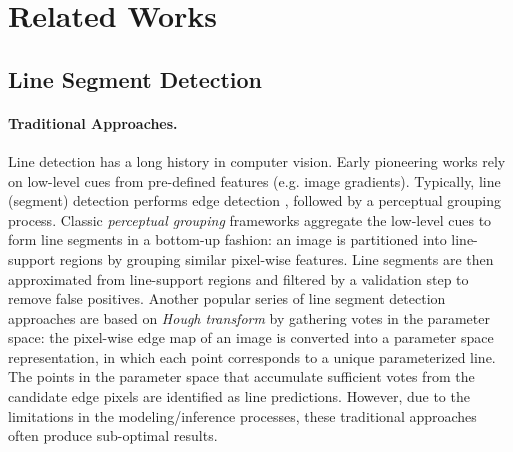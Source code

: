 \documentclass[final]{cvpr}
\begin{document}
\section{Related Works}

\subsection{Line Segment Detection}
\vspace{-2mm}
\paragraph{Traditional Approaches.} Line detection has a long history in computer vision. Early pioneering works rely on low-level cues from pre-defined features (e.g. image gradients). 
Typically, line (segment) detection performs edge detection \cite{canny1986computational,martin2004learning,dollar2006supervised,dollar2013structured,xie2015holistically}, followed by a perceptual grouping \cite{guil1995fast,smith1997susan,elder2002ecological} process.
Classic \textit{perceptual grouping} frameworks \cite{BurnsHR86,boldt1989token,nieto2011line,lu2015cannylines,VonGioi2010} aggregate the low-level cues to form line segments in a bottom-up fashion: an image is partitioned into line-support regions by grouping similar pixel-wise features. Line segments are then approximated from line-support regions and filtered by a validation step to remove false positives. Another popular series of line segment detection approaches are based on \textit{Hough transform} \cite{duda1972use,guil1995fast,matas2000robust,furukawa2003accurate} by gathering votes in the parameter space: the pixel-wise edge map of an image is converted into a parameter space representation, in which each point corresponds to a unique parameterized line. The points in the parameter space that accumulate sufficient votes from the candidate edge pixels are identified as line predictions. However, due to the limitations in the modeling/inference processes, these traditional approaches often produce sub-optimal results.
\vspace{-4mm}
\end{document}
